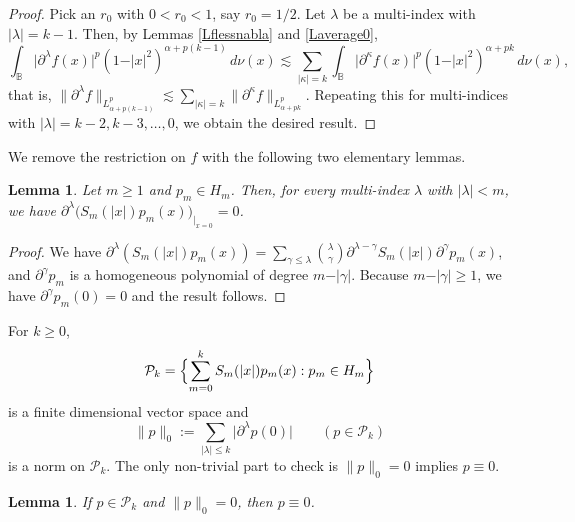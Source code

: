 \documentclass{amsart}
\newtheorem{lemma}[theorem]{Lemma}
\theoremstyle{definition}
\theoremstyle{remark}
\begin{document}
\begin{proof}
Pick an $r_0$ with $0<r_0<1$, say $r_0=1/2$.
Let $\lambda$ be a multi-index with $\vert\lambda\vert=k-1$.
Then, by Lemmas \ref{Lflessnabla} and \ref{Laverage0},
\begin{equation*}
\int_{\mathbb B} \vert\partial^\lambda f(x)\vert^p
(1-\vert x\vert^2)^{\alpha+p(k-1)}\,d\nu(x)
\lesssim
\sum_{\vert\kappa\vert=k}
\int_{\mathbb B} \vert\partial^\kappa f(x)\vert^p
(1-\vert x\vert^2)^{\alpha+pk}\,d\nu(x),
\end{equation*}
that is,
$\|\partial^\lambda f\|_{L^p_{\alpha+p(k-1)}}
\lesssim\sum_{\vert\kappa\vert=k}\|\partial^\kappa f\|_{L^p_{\alpha+pk}}$.
Repeating this for multi-indices with $\vert\lambda\vert=k-2,k-3,\dots,0$,
we obtain the desired result.
\end{proof}

We remove the restriction on $f$ with the following two elementary lemmas.

\begin{lemma}\label{LDerat0}
Let $m\ge 1$ and $p_m\in H_m$.
Then, for every multi-index $\lambda$ with $\vert\lambda\vert<m$, we have
$\partial^\lambda\bigl(S_m(\vert x\vert)p_m(x)\bigr)_{\vert_{x=0}}=0$.
\end{lemma}

\begin{proof}
We have
$\partial^\lambda(S_m(\vert x\vert)p_m(x))
=\sum_{\gamma\le\lambda}\binom{\lambda}{\gamma}
\partial^{\lambda-\gamma} S_m(\vert x\vert)\partial^\gamma p_m(x)$,
and $\partial^\gamma p_m$ is a homogeneous polynomial of degree
$m-\vert\gamma\vert$.
Because $m-\vert\gamma\vert\ge 1$, we have $\partial^\gamma p_m(0)=0$
and the result follows.
\end{proof}

For $k\ge 0$,
\begin{equation*}
\mathcal P_k=\Bigl\{\sum_{m=0}^k S_m(\vert x\vert)p_m(x):p_m\in H_m\Bigr\}
\end{equation*}
is a finite dimensional vector space and
\begin{equation*}
\|p\|_0:=\sum_{\vert\lambda\vert\le k}\vert\partial^\lambda p(0)\vert
\qquad (p\in\mathcal P_k)
\end{equation*}
is a norm on $\mathcal P_k$.
The only non-trivial part to check is $\|p\|_0=0$ implies $p\equiv 0$.

\begin{lemma}\label{Lp0norm}
If $p\in\mathcal P_k$ and $\|p\|_0=0$, then $p\equiv0$.
\end{lemma}
\end{document}
